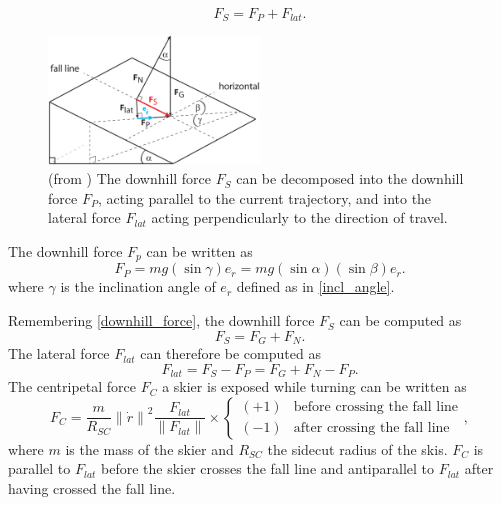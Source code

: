 \documentclass[12pt,a4paper,twoside]{book}
\newcommand{\norm}[1]{\lVert#1\rVert}
\begin{document}
\begin{equation}
F_S=F_P+F_{lat}.
\end{equation}
\begin{figure}
  \begin{center}
    \includegraphics[width=0.5\textwidth]{images/figure5.eps}
    \caption{(from \cite{hol2012}) The downhill force $F_S$ can be decomposed into the downhill force $F_P$, acting parallel to the current trajectory, and into the lateral force $F_{lat}$ acting perpendicularly to the direction of travel.}\label{downhill_force_pic}
  \end{center}
\end{figure}

The downhill force $F_p$ can be written as
\begin{equation}
F_P=mg ( \sin \gamma ) e_{\dot{r}}=mg ( \sin \alpha ) ( \sin \beta ) e_{\dot{r}}.
\end{equation}
where $\gamma$ is the inclination angle of $e_{\dot{r}}$ defined as in \ref{incl_angle}.

Remembering \ref{downhill_force}, the downhill force $F_S$ can be computed as
\begin{equation}
F_S=F_G+F_N.
\end{equation}
The lateral force $F_{lat}$ can therefore be computed as
\begin{equation}
F_{lat}=F_S-F_P=F_G+F_N-F_P.
\end{equation}
The centripetal force $F_C$ a skier is exposed while turning can be written as
\begin{equation}
F_C=\frac{m}{R_{SC}} {\norm{\dot{r}}}^2 \frac{F_{lat}}{\norm{F_{lat}}} \times
\begin{cases}
  (+1) & \text{before crossing the fall line} \\
  (-1) & \text{after crossing the fall line}
  \end{cases},
\end{equation}
where $m$ is the mass of the skier and $R_{SC}$ the sidecut radius of the skis. $F_C$ is parallel to $F_{lat}$ before the skier crosses the fall line and antiparallel to $F_{lat}$ after having crossed the fall line.
\end{document}
